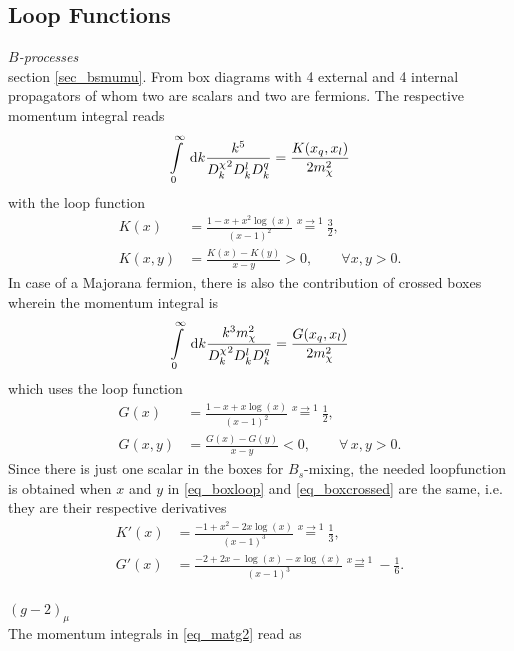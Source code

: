 \begin{appendix}
 \section{Loop Functions}
\label{sec_appendix}
\textit{$B$-processes}\\
\noindent section \ref{sec_bsmumu}. From box diagrams with 4 external and 4 internal propagators of whom two are scalars and two are fermions.
The respective momentum integral reads
\begin{align}
 \int\limits_0^\infty \; \mathrm{d} k \frac{k^5}{{D^\chi_k}^2D^l_k D^q_k} = \frac{K(x_q,x_l)}{2 m_\chi^2}
\end{align}
with the loop function \cite{Grip}
\begin{align}
 K(x)&=\frac{1-x+x^2\log(x)}{(x-1)^2} \stackrel{x\rightarrow 1}{=} \frac32, \\
 K(x,y) &= \frac{K(x)-K(y)}{x-y} > 0, \qquad\forall x,y > 0.
 \label{eq_boxloop}
\end{align}
In case of a Majorana fermion, there is also the contribution of crossed boxes wherein the momentum integral is 
\begin{align}
\int\limits_0^\infty \; \mathrm{d} k \frac{k^3  m_\chi^2}{{D^\chi_k}^2D^l_k D^q_k} = \frac{G(x_q,x_l)}{2m_\chi^2}
 \label{eq_crossedBox}
\end{align}
which uses the loop function
\begin{align}
 G(x)&=\frac{1-x+x\log(x)}{(x-1)^2} \stackrel{x\rightarrow 1}{=} \frac12,\\
 G(x,y) &= \frac{G(x)-G(y)}{x-y} < 0,\qquad \forall\, x,y>0.
 \label{eq_boxcrossed}
\end{align}
Since there is just one scalar in the boxes for $B_s$-mixing, the needed loopfunction is obtained when $x$ and $y$ in \eqref{eq_boxloop} and 
\eqref{eq_boxcrossed} are the same, i.e. they are their respective derivatives
\begin{align}
 K'(x)&=\frac{-1+x^2-2x\log(x)}{(x-1)^3} \stackrel{x\rightarrow 1}{=} \frac13,\\
 G'(x)&=\frac{-2+2x-\log(x)-x\log(x)}{(x-1)^3} \stackrel{x\rightarrow 1}{=} -\frac16.
 \label{eq_mixloops}
\end{align}
\\ $(g-2)_\mu$\\
\noindent 
The momentum integrals in \eqref{eq_matg2} read as


\end{appendix}
